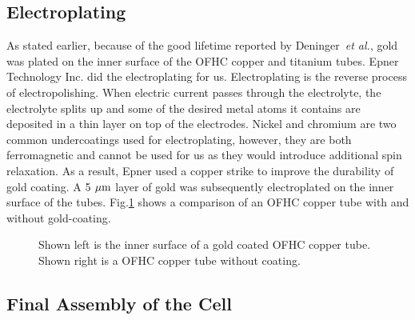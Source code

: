 \subsection{Electroplating}

As stated earlier, because of the good lifetime reported by Deninger~\emph{et al.}\cite{Deninger2006}, gold was plated on the inner surface of the OFHC copper and titanium tubes. Epner Technology Inc. did the electroplating for us. Electroplating is the reverse process of electropolishing. When electric current passes through the electrolyte, the electrolyte splits up and some of the desired metal atoms it contains are deposited in a thin layer on top of the electrodes. Nickel and chromium are two common undercoatings used for electroplating, however, they are both ferromagnetic and cannot be used for us as they would introduce additional spin relaxation. As a result, Epner used a copper strike to improve the durability of gold coating. A 5 ${\rm \mu m}$ layer of gold was subsequently electroplated on the inner surface of the tubes. Fig.\ref{gold_coating} shows a comparison of an OFHC copper tube with and without gold-coating.

\begin{figure}[t!]
	\centering
	\caption{{Shown left is the inner surface of a gold coated OFHC copper tube. Shown right is a OFHC copper tube without coating.}}
	\label{gold_coating}
\end{figure}

\subsection{Final Assembly of the Cell}

